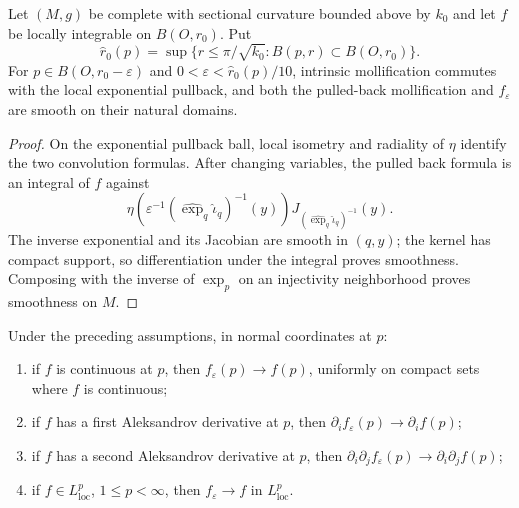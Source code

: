 \begin{lemma}
\label{lem:intrinsic-mollification-smooth}
Let $(M,g)$ be complete with sectional curvature bounded above by $k_0$ and
let $f$ be locally integrable on $B(O,r_0)$.  Put
\[
\widehat r_0(p)=\sup\{r\leq\pi/\sqrt{k_0}:B(p,r)\subset B(O,r_0)\}.
\]
For $p\in B(O,r_0-\varepsilon)$ and
$0<\varepsilon<\widehat r_0(p)/10$, intrinsic mollification commutes with the
local exponential pullback, and both the pulled-back mollification and
$f_\varepsilon$ are smooth on their natural domains.
\end{lemma}

\begin{proof}
On the exponential pullback ball, local isometry and radiality of $\eta$
identify the two convolution formulas.  After changing variables, the pulled
back formula is an integral of $f$ against
\[
\eta\!\left(\varepsilon^{-1}(\widehat{\exp}_q\widehat{\iota}_q)^{-1}(y)\right)
 J_{(\widehat{\exp}_q\widehat{\iota}_q)^{-1}}(y).
\]
The inverse exponential and its Jacobian are smooth in $(q,y)$; the kernel
has compact support, so differentiation under the integral proves smoothness.
Composing with the inverse of $\exp_p$ on an injectivity neighborhood proves
smoothness on $M$.
\end{proof}

\begin{lemma}
\label{lem:intrinsic-mollifier-derivative-convergence}
Under the preceding assumptions, in normal coordinates at $p$:
\begin{enumerate}
\item if $f$ is continuous at $p$, then $f_\varepsilon(p)\to f(p)$, uniformly
on compact sets where $f$ is continuous;
\item if $f$ has a first Aleksandrov derivative at $p$, then
$\partial_if_\varepsilon(p)\to\partial_if(p)$;
\item if $f$ has a second Aleksandrov derivative at $p$, then
$\partial_i\partial_jf_\varepsilon(p)\to\partial_i\partial_jf(p)$;
\item if $f\in L^p_{\mathrm{loc}}$, $1\leq p<\infty$, then
$f_\varepsilon\to f$ in $L^p_{\mathrm{loc}}$.
\end{enumerate}
\end{lemma}

